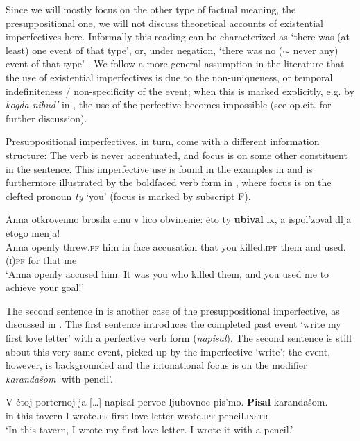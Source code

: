 \documentclass[output=paper,modfonts,newtxmath,hidelinks
]{langscibook}
\begin{document}
\noindent Since we will mostly focus on the other type of factual meaning, the presuppositional one, we will not discuss theoretical accounts of existential imperfectives here. Informally this reading can be characterized as `there was (at least) one event of that type', or, under negation, `there was no ($\sim$ never any) event of that type' \citep[see][]{mehlig01, mehlig13, muellerkrat, muellerPI, gehrkemueller}. We follow a more general assumption in the literature that the use of existential imperfectives is due to the non-uniqueness, or temporal indefiniteness / non-specificity of the event; when this is marked explicitly, e.g. by \textit{kogda-nibud'} in , the use of the perfective becomes impossible (see op.cit. for further discussion). 

Presuppositional imperfectives, in turn, come with a different information structure: The verb is never accentuated, and  focus is on some other constituent in the sentence. This imperfective use is found in the examples in  and is furthermore illustrated by the boldfaced verb form in , where focus is on the clefted pronoun \textit{ty} `you' (focus is marked by subscript F).

\ea\gll	Anna otkrovenno brosila emu v lico obvinenie: \.{e}to ty \textbf{ubival} ix, a ispol'zoval dlja \.{e}togo menja!\\ 						
	Anna openly threw.\textsc{pf} him in face accusation that you killed.\textsc{ipf} them and used.\textsc{(i)pf} for that me\\
\glt	`Anna openly accused him: It was you who killed them, and you used me to achieve your goal!' \hfill \citep[after][131]{gronndiss}\label{Anna}
\z

\noindent The second sentence in  \citep[attributed to][]{forsyth70} is another case of the presuppositional imperfective, as discussed in \citet[][192f.]{gronndiss}. The first sentence introduces the completed past event `write my first love letter' with a perfective verb form (\textit{napisal}). The second sentence is still about this very same event, picked up by the imperfective `write'; the event, however, is backgrounded and the intonational focus is on the modifier \textit{karandašom} `with pencil'.

\ea\label{love letter} \gll V \.{e}toj porternoj ja [\dots] napisal pervoe ljubovnoe pis'mo. \textbf{Pisal} karandašom.\\
in this tavern I {} wrote.\textsc{pf} first love letter 			 wrote.\textsc{ipf} pencil.\textsc{instr}\\
\glt `In this tavern, I wrote my first love letter. I wrote it with a pencil.'
\z
\end{document}
